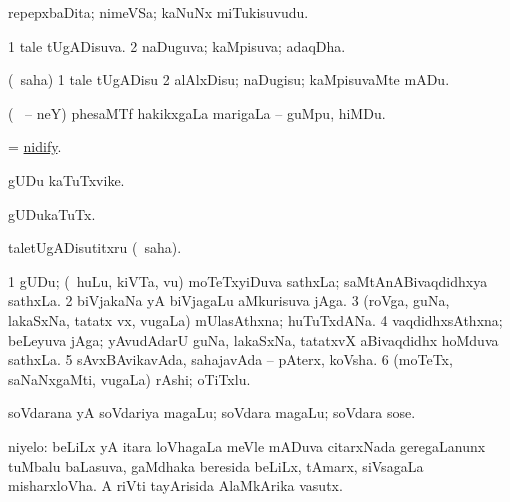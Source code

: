 \bentry
{}
\gl{\nA}
\bmng
repepxbaDita; nimeVSa; kaNuNx miTukisuvudu. 
\emng
\eentry

\bentry
{}
\gl{\gu}
\bmng
\bnum
\num{1} tale tUgADisuva. 
\num{2} naDuguva; kaMpisuva; adaqDha. 
\enum
\emng
\eentry

\bentry
{}
\gl{\sakirx}
\bmng
(\akirx\ saha) 
\bnum
\num{1} tale tUgADisu 
\num{2} alAlxDisu; naDugisu; kaMpisuvaMte mADu. 
\enum
\emng
\eentry

\bentry
{}
\gl{\nA}
\bmng
(\birx\  \ucAcx-- neY) phesaMTf hakikxgaLa marigaLa -- guMpu, hiMDu. 
\emng
\eentry

\bentry
{}
\gl{\akirx}
\bmng
= \hyperlink{nidify}{nidify}. 
\emng
\eentry

\bentry
{}
\gl{\nA}
\bmng
gUDu kaTuTxvike. 
\emng
\eentry

\bentry
{}
\gl{\akirx}
\bmng
gUDukaTuTx. 
\emng
\eentry

\bentry
{}
\gl{\akirx}
\bmng
taletUgADisutitxru (\sakirx\ saha). 
\emng
\eentry

\bentry
{}
\gl{\nA}
\bmng
\bnum
\num{1} gUDu; (\kanmu\ huLu, kiVTa, \mo vu) moTeTxyiDuva sathxLa; saMtAnABivaqdidhxya sathxLa. 
\num{2} biVjakaNa yA biVjagaLu aMkurisuva jAga. 
\num{3} (roVga, guNa, lakaSxNa, tatatx vx, \mo vugaLa) mUlasAthxna; huTuTxdANa. 
\num{4} vaqdidhxsAthxna; beLeyuva jAga; yAvudAdarU guNa, lakaSxNa, tatatxvX aBivaqdidhx hoMduva sathxLa. 
\num{5} sAvxBAvikavAda, sahajavAda -- pAterx, koVsha. 
\num{6} (moTeTx, saNaNxgaMti, \mo vugaLa) rAshi; oTiTxlu. 
\enum
\emng
\eentry

\bentry
{}
\gl{\nA}
\bmng
soVdarana yA soVdariya magaLu; soVdara magaLu; soVdara sose. 
\emng
\eentry

\bentry
{}
\gl{\nA}
\bmng
niyelo: 
\banum
{} beLiLx yA itara loVhagaLa meVle mADuva citarxNada geregaLanunx tuMbalu baLasuva, gaMdhaka beresida beLiLx, tAmarx, siVsagaLa misharxloVha. 
 A riVti tayArisida AlaMkArika vasutx. 
\eanum
\emng
\eentry

